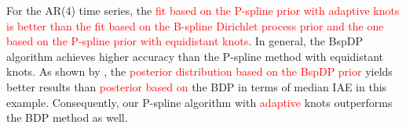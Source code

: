 \documentclass[twocolumn,final]{svjour3}
\begin{document}

For the AR(4) time series, the \textcolor{red}{fit based on the P-spline prior with \textcolor{red}{adaptive} knots is better than the fit based on the B-spline Dirichlet process prior and the one based on the P-spline prior with equidistant knots}.
 In general, the BspDP algorithm achieves higher accuracy than the P-spline method with equidistant knots.  As shown by \cite{Edwards2019}, the \textcolor{red}{posterior distribution based on the BspDP prior} yields better results than \textcolor{red}{posterior based on } the BDP in terms of median IAE in this example.  Consequently, our P-spline algorithm with \textcolor{red}{adaptive} knots outperforms the BDP method as well.


\end{document}
